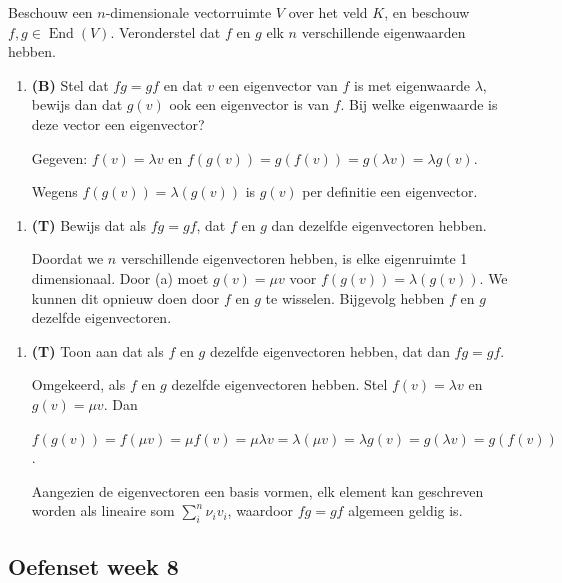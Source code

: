 \begin{oefening}[6.3.6]
    Beschouw een $n$-dimensionale vectorruimte $V$ over het veld $K$, en beschouw $f, g \in \operatorname{End}(V)$. Veronderstel dat $f$ en $g$ elk $n$ verschillende eigenwaarden hebben.
    \begin{enumerate}
        \item[(a)] \textbf{(B)} Stel dat $fg = gf$ en dat $v$ een eigenvector van $f$ is met eigenwaarde $\lambda$, bewijs dan dat $g(v)$ ook een eigenvector is van $f$. Bij welke eigenwaarde is deze vector een eigenvector?
   
        Gegeven: \(f(v) = \lambda v\) en \(f(g(v)) = g(f(v)) = g(\lambda v) = \lambda g(v)\).
        
        Wegens \(f(g(v)) = \lambda(g(v))\) is \(g(v)\) per definitie een eigenvector.
    \end{enumerate}
     \begin{enumerate}
        \item[(b)] \textbf{(T)} Bewijs dat als $fg = gf$, dat $f$ en $g$ dan dezelfde eigenvectoren hebben.
   
        Doordat we \(n\) verschillende eigenvectoren hebben, is elke eigenruimte 1 dimensionaal.
        Door (a) moet \(g(v) = \mu v\) voor \(f(g(v)) = \lambda(g(v))\).
        We kunnen dit opnieuw doen door \(f\) en \(g\) te wisselen.
        Bijgevolg hebben \(f\) en \(g\) dezelfde eigenvectoren. 
    \end{enumerate}
    \begin{enumerate}
        \item[(c)] \textbf{(T)} Toon aan dat als $f$ en $g$ dezelfde eigenvectoren hebben, dat dan $fg = gf$.
    
        Omgekeerd, als $f$ en $g$ dezelfde eigenvectoren hebben.
        Stel \(f(v) = \lambda v\) en \(g(v) = \mu v\). Dan 

        \(f(g(v)) 
        = f(\mu v) 
        = \mu f(v) 
        = \mu\lambda v 
        = \lambda (\mu v) 
        = \lambda g(v)
        = g(\lambda v)
        = g(f(v))
        \).

        Aangezien de eigenvectoren een basis vormen, elk element kan geschreven worden als lineaire som \(\sum_{i}^{n} \nu_i v_i\),
        waardoor \(fg=gf \) algemeen geldig is.
    \end{enumerate}
\end{oefening}

\subsection{Oefenset week 8}

